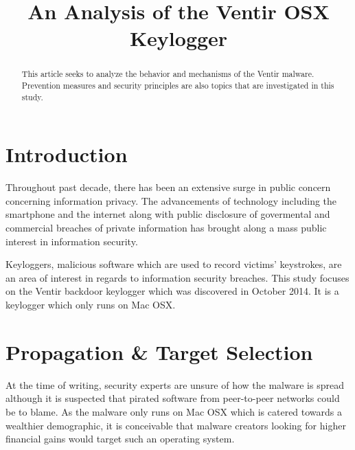 \documentclass[conference]{IEEEtran}
\begin{document}
\title{An Analysis of the Ventir OSX Keylogger}


\author{
\and
{}
}


\maketitle

\begin{abstract}
This article seeks to analyze the behavior and mechanisms of the Ventir malware.
Prevention measures and security principles are also topics that are
investigated in this study.
\end{abstract}

\section{Introduction}
Throughout past decade, there has been an extensive surge in public concern
concerning information privacy. The advancements of technology including the
smartphone and the internet along with public disclosure of govermental and
commercial breaches of private information has brought along a mass public
interest in information security\cite{eset_trends}.

Keyloggers, malicious software which are used to record victims' keystrokes, are
an area of interest in regards to information security breaches. This study
focuses on the Ventir backdoor keylogger which was discovered in October 2014.
It is a keylogger which only runs on Mac OSX.

\section{Propagation \& Target Selection}
At the time of writing, security experts are unsure of how the malware is spread
although it is suspected that pirated software from peer-to-peer networks could
be to blame\cite{kuzin_ventir_2014}. As the malware only runs on Mac OSX which
is catered towards a wealthier demographic, it is conceivable that malware
creators looking for higher financial gains would target such an operating
system\cite{scharr_ventir}.
\end{document}
